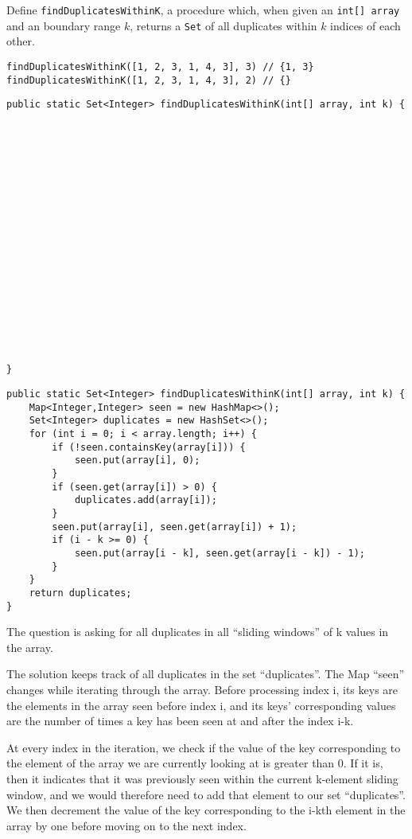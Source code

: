 \begin{blocksection}
\question Define \lstinline$findDuplicatesWithinK$, a procedure which, when
given an \lstinline$int[] array$ and an boundary range $k$, returns a
\lstinline$Set$ of all  duplicates within $k$ indices of each other.

\begin{lstlisting}
findDuplicatesWithinK([1, 2, 3, 1, 4, 3], 3) // {1, 3}
findDuplicatesWithinK([1, 2, 3, 1, 4, 3], 2) // {}
\end{lstlisting}

\ifprintanswers\else
\begin{lstlisting}
public static Set<Integer> findDuplicatesWithinK(int[] array, int k) {



















}
\end{lstlisting}
\fi

\begin{solution}
\begin{lstlisting}
public static Set<Integer> findDuplicatesWithinK(int[] array, int k) {
    Map<Integer,Integer> seen = new HashMap<>();
    Set<Integer> duplicates = new HashSet<>();
    for (int i = 0; i < array.length; i++) {
        if (!seen.containsKey(array[i])) {
            seen.put(array[i], 0);
        }
        if (seen.get(array[i]) > 0) {
            duplicates.add(array[i]);
        }
        seen.put(array[i], seen.get(array[i]) + 1);
        if (i - k >= 0) {
            seen.put(array[i - k], seen.get(array[i - k]) - 1);
        }
    }
    return duplicates;
}
\end{lstlisting}

The question is asking for all duplicates in all ``sliding windows'' of k values in the array.

The solution keeps track of all duplicates in the set ``duplicates''. 
The Map ``seen'' changes while iterating through the array. Before processing index i, its keys are the elements in the array seen before index i, and its keys' corresponding values are the number of times a key has been seen at and after the index i-k.

At every index in the iteration, we check if the value of the key corresponding to the element of the array we are currently looking at is greater than 0. If it is, then it indicates that it was previously seen within the current k-element sliding window, and we would therefore need to add that element to our set ``duplicates''. We then decrement the value of the key corresponding to the i-kth element in the array by one before moving on to the next index.
\end{solution}
\end{blocksection}

